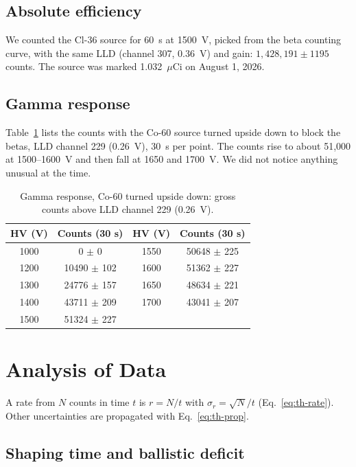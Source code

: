 \documentclass[12pt]{article}
\begin{document}
\subsection{Absolute efficiency}

We counted the Cl-36 source for 60~s at 1500~V, picked from the beta counting curve, with the same LLD (channel 307, 0.36~V) and gain: $1{,}428{,}191 \pm 1195$ counts. The source was marked 1.032~$\mu$Ci on August 1, 2026.

\subsection{Gamma response}

Table~\ref{tab:rawgamma} lists the counts with the Co-60 source turned upside down to block the betas, LLD channel 229 (0.26~V), 30~s per point. The counts rise to about 51,000 at 1500--1600~V and then fall at 1650 and 1700~V. We did not notice anything unusual at the time.

\begin{table}[!htbp]
\centering\small
\begin{tabular}{cc|cc}
\toprule
\textbf{HV (V)} & \textbf{Counts (30 s)} & \textbf{HV (V)} & \textbf{Counts (30 s)} \\
\midrule
1000 & 0 $\pm$ 0 & 1550 & 50648 $\pm$ 225 \\
1200 & 10490 $\pm$ 102 & 1600 & 51362 $\pm$ 227 \\
1300 & 24776 $\pm$ 157 & 1650 & 48634 $\pm$ 221 \\
1400 & 43711 $\pm$ 209 & 1700 & 43041 $\pm$ 207 \\
1500 & 51324 $\pm$ 227 & & \\
\bottomrule
\end{tabular}
\caption{Gamma response, Co-60 turned upside down: gross counts above LLD channel 229 (0.26~V).}
\label{tab:rawgamma}
\end{table}

\section{Analysis of Data}
\label{sec:analysis}

A rate from $N$ counts in time $t$ is $r = N/t$ with $\sigma_r = \sqrt{N}/t$ (Eq.~\ref{eq:th-rate}). Other uncertainties are propagated with Eq.~\ref{eq:th-prop}.

\subsection{Shaping time and ballistic deficit}
\end{document}
